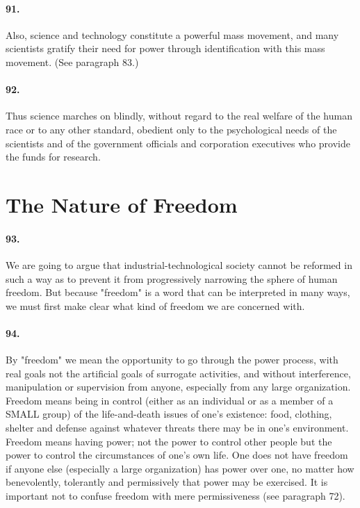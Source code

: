 \documentclass[12pt]{book}
\newcommand{\mysection}[1]{\section*{#1} \addcontentsline{toc}{section}{#1}}
\begin{document}
\paragraph{91.}  Also, science and technology constitute a powerful mass movement, and many scientists gratify their need for power through identification with this mass movement. (See paragraph 83.)


\paragraph{92.} Thus science marches on blindly, without regard to the real welfare of the human race or to any other standard, obedient only to the psychological needs of the scientists and of the government officials and corporation executives who provide the funds for research.

\mysection{The Nature of Freedom}


\paragraph{93.}  We are going to argue that industrial-technological society cannot be reformed in such a way as to prevent it from progressively narrowing the sphere of human freedom. But because "freedom" is a word that can be interpreted in many ways, we must first make clear what kind of freedom we are concerned with.


\paragraph{94.}  By "freedom" we mean the opportunity to go through the power process, with real goals not the artificial goals of surrogate activities, and without interference, manipulation or supervision from anyone, especially from any large organization. Freedom means being in control (either as an individual or as a member of a SMALL group) of the life-and-death issues of one's existence: food, clothing, shelter and defense against whatever threats there may be in one's environment. Freedom means having power; not the power to control other people but the power to control the circumstances of one's own life. One does not have freedom if anyone else (especially a large organization) has power over one, no matter how benevolently, tolerantly and permissively that power may be exercised. It is important not to confuse freedom with mere permissiveness (see paragraph 72).
\end{document}
